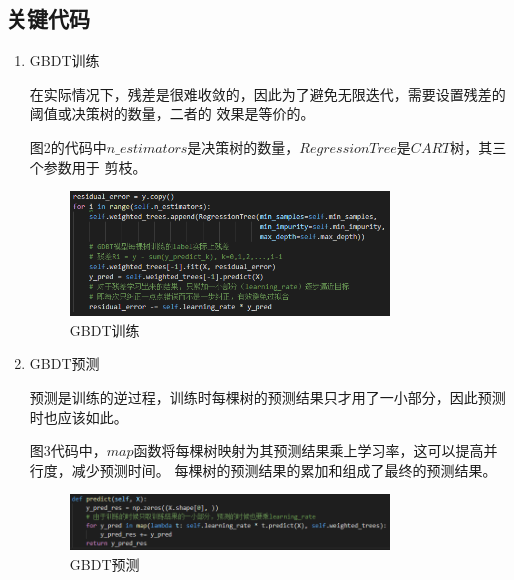 \documentclass[UTF8,a4paper,12pt]{article}
\begin{document}
\subsection{关键代码}
\begin{enumerate}[itemindent=0.5em,label=\arabic*、]
  \item GBDT训练
  \par \qquad 在实际情况下，残差是很难收敛的，因此为了避免无限迭代，需要设置残差的阈值或决策树的数量，二者的
  效果是等价的。
  \par \qquad 图2的代码中$n\_estimators$是决策树的数量，$RegressionTree$是$CART$树，其三个参数用于
  剪枝。
  \begin{figure}[h]
  \begin{center}
  \includegraphics[width=0.8\textwidth]{train.png} %
  \caption{GBDT训练}
  \end{center}
  \end{figure}
  \item GBDT预测
  \par \qquad 预测是训练的逆过程，训练时每棵树的预测结果只才用了一小部分，因此预测时也应该如此。
  \par \qquad 图3代码中，$map$函数将每棵树映射为其预测结果乘上学习率，这可以提高并行度，减少预测时间。
  每棵树的预测结果的累加和组成了最终的预测结果。
  \begin{figure}[h]
  \begin{center}
  \includegraphics[width=0.8\textwidth]{predict.png} %
  \caption{GBDT预测}
  \end{center}
  \end{figure}


\end{enumerate}
\end{document}
